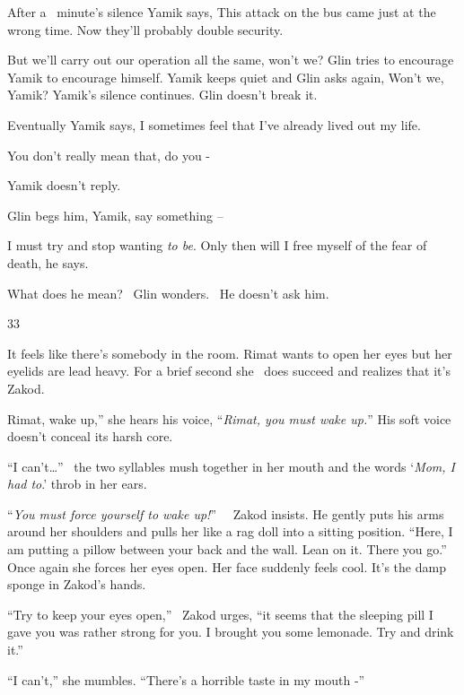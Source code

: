 \documentclass[letterpaper]{article}
\begin{document}
After a \ minute's silence Yamik says, {\textquotedbl}This attack on the bus came just at the wrong time. Now they'll
probably double security.{\textquotedbl} 

{\textquotedbl}But we'll carry out our operation all the same, won't we?{\textquotedbl} Glin tries to encourage Yamik to
encourage himself. Yamik keeps quiet and Glin asks again, {\textquotedbl}Won't we, Yamik?{\textquotedbl} Yamik's
silence continues. Glin doesn't break it.

Eventually Yamik says, {\textquotedbl}I sometimes feel that I've already lived out my life.{\textquotedbl} 

{\textquotedbl}You don't really mean that, do you -{\textquotedbl}

Yamik doesn't reply.

Glin begs him, {\textquotedbl}Yamik, say something --{\textquotedbl} 

{\textquotedbl}I must try and stop wanting \textit{to be}. Only then will I free myself of the fear of
death,{\textquotedbl} he says. 

What does he mean? \ Glin wonders. \ He doesn't ask him.


\bigskip

33 

It feels like there's somebody in the room. Rimat wants to open her eyes but her eyelids are lead heavy. For a brief
second she \ does succeed and realizes that it's Zakod.

{\textquotedbl}Rimat, wake up,'' she hears his voice, ``\textit{Rimat, you must wake up.}{}''\textit{ }His soft voice
doesn't conceal its harsh core. 

{}``I can't{\dots}'' \ the two syllables mush together in her mouth and the words `\textit{Mom, I had to}.' throb in her
ears.

{}``\textit{You must force yourself to wake up!}{}'' \textit{\ }\ Zakod insists. He gently puts his arms around her
shoulders and pulls her like a rag doll into a sitting position. ``Here, I am putting a pillow between your back and
the wall. Lean on it. There you go.'' Once again she forces her eyes open. Her face suddenly feels cool. It's the damp
sponge in Zakod's hands. 

{}``Try to keep your eyes open,'' \ Zakod urges, ``it seems that the sleeping pill I gave you was rather strong for you.
I brought you some lemonade. Try and drink it.''

{}``I can't,'' she mumbles. ``There's a horrible taste in my mouth -'' 
\end{document}
